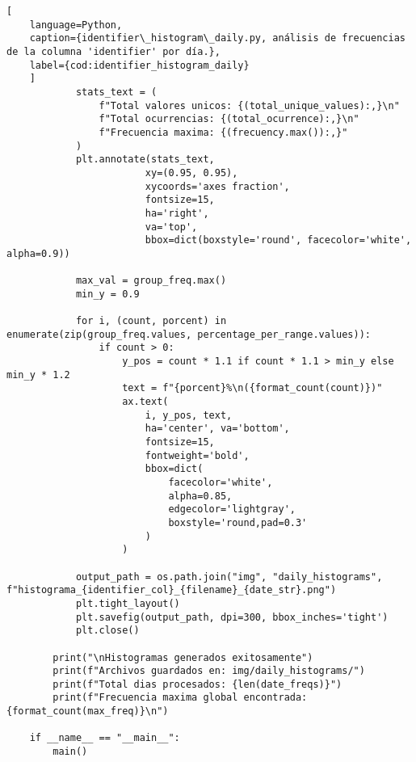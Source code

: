 \begin{lstlisting}[
    language=Python,
    caption={identifier\_histogram\_daily.py, análisis de frecuencias de la columna 'identifier' por día.},
    label={cod:identifier_histogram_daily}
    ]
            stats_text = (
                f"Total valores unicos: {(total_unique_values):,}\n"
                f"Total ocurrencias: {(total_ocurrence):,}\n"
                f"Frecuencia maxima: {(frecuency.max()):,}"
            )
            plt.annotate(stats_text, 
                        xy=(0.95, 0.95), 
                        xycoords='axes fraction', 
                        fontsize=15,
                        ha='right', 
                        va='top',
                        bbox=dict(boxstyle='round', facecolor='white', alpha=0.9))
            
            max_val = group_freq.max()
            min_y = 0.9  
            
            for i, (count, porcent) in enumerate(zip(group_freq.values, percentage_per_range.values)):
                if count > 0:
                    y_pos = count * 1.1 if count * 1.1 > min_y else min_y * 1.2
                    text = f"{porcent}%\n({format_count(count)})"
                    ax.text(
                        i, y_pos, text, 
                        ha='center', va='bottom', 
                        fontsize=15, 
                        fontweight='bold',
                        bbox=dict(
                            facecolor='white', 
                            alpha=0.85, 
                            edgecolor='lightgray', 
                            boxstyle='round,pad=0.3'
                        )
                    )

            output_path = os.path.join("img", "daily_histograms", f"histograma_{identifier_col}_{filename}_{date_str}.png")
            plt.tight_layout()
            plt.savefig(output_path, dpi=300, bbox_inches='tight')
            plt.close()
        
        print("\nHistogramas generados exitosamente")
        print(f"Archivos guardados en: img/daily_histograms/")
        print(f"Total dias procesados: {len(date_freqs)}")
        print(f"Frecuencia maxima global encontrada: {format_count(max_freq)}\n")

    if __name__ == "__main__":
        main()
    
\end{lstlisting}
\vfill

